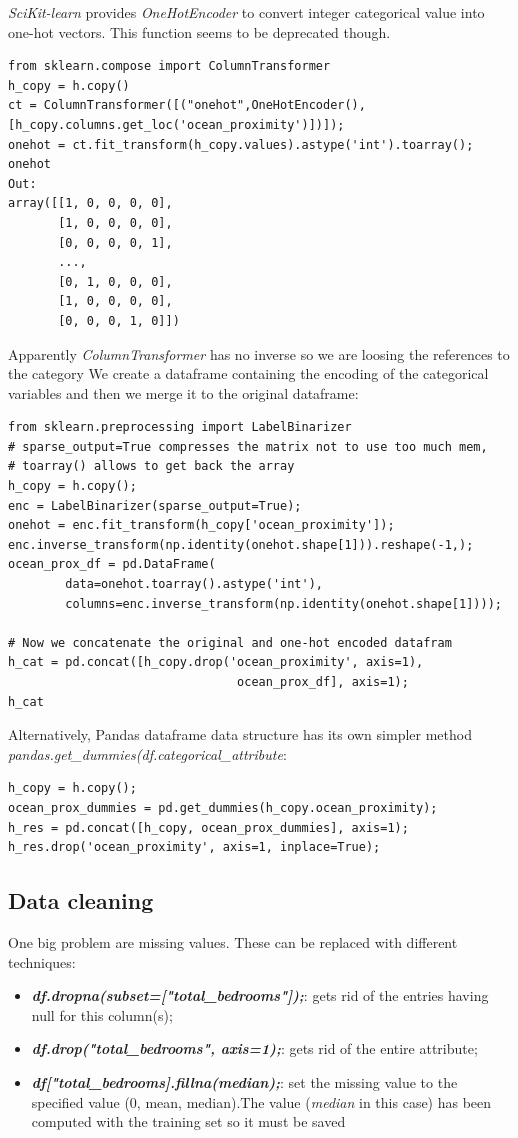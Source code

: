 \documentclass[12pt, letterpaper]{article}
\theoremstyle{definition}
\let\ti\textit
\let\tb\textbf
\begin{document}
\ti{SciKit-learn} provides \ti{OneHotEncoder} to convert integer categorical value into one-hot vectors. This function seems to be deprecated though.

\begin{lstlisting}[caption=Usage of \ti{ColumnTransformer}]
from sklearn.compose import ColumnTransformer
h_copy = h.copy()
ct = ColumnTransformer([("onehot",OneHotEncoder(),[h_copy.columns.get_loc('ocean_proximity')])]);
onehot = ct.fit_transform(h_copy.values).astype('int').toarray();
onehot
Out:
array([[1, 0, 0, 0, 0],
       [1, 0, 0, 0, 0],
       [0, 0, 0, 0, 1],
       ...,
       [0, 1, 0, 0, 0],
       [1, 0, 0, 0, 0],
       [0, 0, 0, 1, 0]])
\end{lstlisting}
Apparently \ti{ColumnTransformer} has no inverse so we are loosing the references to the category
We create a dataframe containing the encoding of the categorical variables and then we merge it to the original dataframe:
\begin{lstlisting}[caption=Usage of \ti{LabelBinarizer}]
from sklearn.preprocessing import LabelBinarizer
# sparse_output=True compresses the matrix not to use too much mem, 
# toarray() allows to get back the array
h_copy = h.copy();
enc = LabelBinarizer(sparse_output=True);
onehot = enc.fit_transform(h_copy['ocean_proximity']);
enc.inverse_transform(np.identity(onehot.shape[1])).reshape(-1,);
ocean_prox_df = pd.DataFrame(
		data=onehot.toarray().astype('int'), 
		columns=enc.inverse_transform(np.identity(onehot.shape[1])));

# Now we concatenate the original and one-hot encoded datafram
h_cat = pd.concat([h_copy.drop('ocean_proximity', axis=1), 
								ocean_prox_df], axis=1);
h_cat
\end{lstlisting}

Alternatively, Pandas dataframe data structure has its own simpler method \ti{pandas.get\_dummies(df.categorical\_attribute}:
\begin{lstlisting}[caption=Usage of \ti{pd.get\_dummies()}]
h_copy = h.copy();
ocean_prox_dummies = pd.get_dummies(h_copy.ocean_proximity);
h_res = pd.concat([h_copy, ocean_prox_dummies], axis=1);
h_res.drop('ocean_proximity', axis=1, inplace=True);
\end{lstlisting}

\subsection{Data cleaning}
One big problem are missing values. These can be replaced with different techniques:
\begin{itemize}
\item \tb{\ti{df.dropna(subset=["total\_bedrooms"]);}}: gets rid of the entries having null for this column(s);
\item \tb{\ti{df.drop("total\_bedrooms", axis=1);}}: gets rid of the entire attribute;
\item \tb{\ti{df["total\_bedrooms].fillna(median);}}: set the missing value to the specified value (0, mean, median).The value (\ti{median} in this case) has been computed with the training set so it must be saved
\end{itemize}
\end{document}

